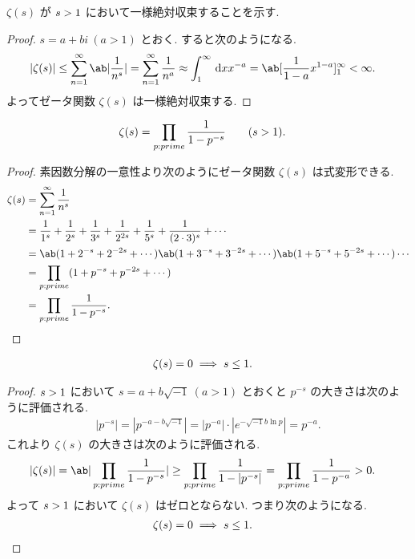 \documentclass[uplatex,diffipdfmx,a4paper,11pt]{jlreq}
\begin{document}
\begin{proposition}
  $\zeta(s)$ が $\real s > 1$ において一様絶対収束することを示す.
\end{proposition}
\begin{proof}
  $s = a + bi\ (a > 1)$ とおく. すると次のようになる.
  \begin{align}
    |\zeta(s)| & \leq \sum_{n=1}^{\infty}\ab|\frac{1}{n^s}| = \sum_{n=1}^{\infty}\frac{1}{n^a} \approx \int_{1}^{\infty}\dl{x}x^{-a} = \ab[\frac{1}{1 - a}x^{1-a}]_1^\infty < \infty.
  \end{align}
  よってゼータ関数 $\zeta(s)$ は一様絶対収束する.
\end{proof}

\begin{proposition}
  \begin{align}
    \zeta(s) & = \prod_{p:prime}\frac{1}{1 - p^{-s}} \qquad (\real s > 1).
  \end{align}
\end{proposition}
\begin{proof}
  素因数分解の一意性より次のようにゼータ関数 $\zeta(s)$ は式変形できる.
  \begin{align}
    \zeta(s) & = \sum_{n=1}^{\infty}\frac{1}{n^s}                                                                                   \\
             & = \frac{1}{1^s} + \frac{1}{2^s} + \frac{1}{3^s} + \frac{1}{2^{2s}} + \frac{1}{5^s} + \frac{1}{(2\cdot 3)^s} + \cdots \\
             & = \ab(1 + 2^{-s} + 2^{-2s} + \cdots)\ab(1 + 3^{-s} + 3^{-2s} + \cdots)\ab(1 + 5^{-s} + 5^{-2s} + \cdots)\cdots       \\
             & = \prod_{p:prime}(1 + p^{-s} + p^{-2s} + \cdots)                                                                     \\
             & = \prod_{p:prime}\frac{1}{1 - p^{-s}}.
  \end{align}
\end{proof}

\begin{proposition}
  \begin{align}
    \zeta(s) & = 0 \implies \real s \leq 1.
  \end{align}
\end{proposition}
\begin{proof}
  $\real s > 1$ において $s = a + b\sqrt{-1}\ (a > 1)$ とおくと $p^{-s}$ の大きさは次のように評価される.
  \begin{align}
    |p^{-s}| = |p^{-a-b\sqrt{-1}}| = |p^{-a}|\cdot|e^{-\sqrt{-1}b\ln p}| = p^{-a}.
  \end{align}
  これより $\zeta(s)$ の大きさは次のように評価される.
  \begin{align}
    |\zeta(s)| & = \ab|\prod_{p:prime}\frac{1}{1 - p^{-s}}| \geq \prod_{p:prime}\frac{1}{1 - |p^{-s}|} = \prod_{p:prime}\frac{1}{1 - p^{-a}} > 0.
  \end{align}
  よって $\real s > 1$ において $\zeta(s)$ はゼロとならない. つまり次のようになる.
  \begin{align}
    \zeta(s) & = 0 \implies \real s \leq 1.
  \end{align}
\end{proof}
\end{document}
